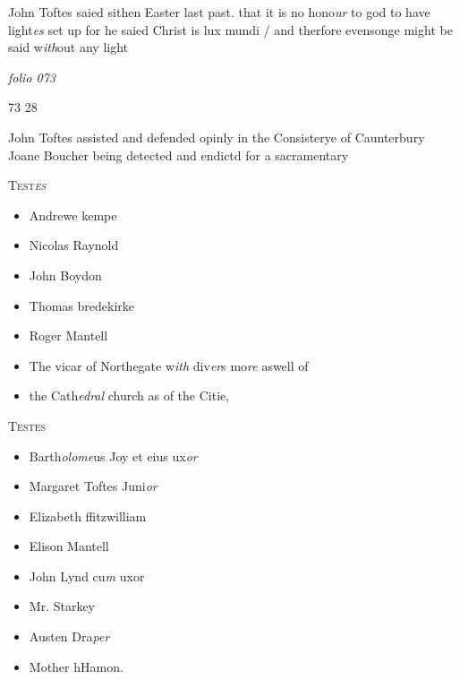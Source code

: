 \documentclass[12pt, a4paper]{book}
\begin{document}
			
		\ifthenelse{\isodd{\thepage}}
		{\reversemarginpar}
		{\normalmarginpar}
		John Toftes saied sithen Easter last past. that
 it is no hono\textit{ur} to god to have light\textit{es} set up
 for he saied Christ is lux mundi / and therfore
 evensonge might be said w\textit{ith}out any light



\dotfill
					

\textit{folio 073}


\begin{flushright}{\color{Mahogany}73} 28\end{flushright}
	
		\ifthenelse{\isodd{\thepage}}
		{\reversemarginpar}
		{\normalmarginpar}
		John Toftes assisted and defended opinly in the
		Consisterye of Caunterbury Joane Boucher
 being detected and endictd for a sacramentary
\begin{center} {\scshape Test\textit{es}} \end{center}\begin{itemize}
	\item[]Andrewe kempe
	\item[]Nicolas Raynold
	\item[]John Boydon
	\item[]Thomas bredekirke
	\item[]Roger Mantell
	\item[]The vicar of Northegate w\textit{ith} div\textit{er}s mo\textit{re} aswell of
	\item[]the Cath\textit{edral }church as of the Citie,\end{itemize}
 
 	\begin{center} {\scshape Testes} \end{center}\begin{itemize}
 		
 		\item[]Barth\textit{olome}us Joy et eius ux\textit{or}
 		\item[]Margaret Toftes Juni\textit{or}
 		\item[]Elizabeth ffitzwilliam
 		\item[]Elison Mantell
 		\item[]John Lynd cu\textit{m} uxor
 		\item[]Mr. Starkey
 		\item[]Austen Dra\textit{per}
 		\item[]Mother hHamon.
 	\end{itemize}
 
\end{document}
